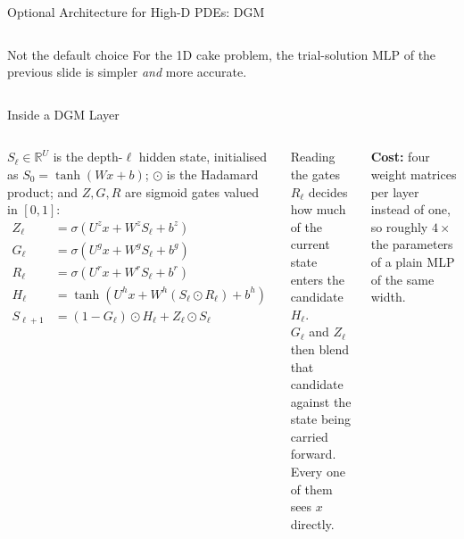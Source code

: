 \documentclass[aspectratio=169,11pt]{beamer}
\newcommand{\R}{\mathbb{R}}
\begin{document}
\begin{frame}{Optional Architecture for High-D PDEs: DGM}
\begin{columns}[T]
\vspace{0.4em}
\begin{alertblock}{Not the default choice}
\footnotesize
For the 1D cake problem, the trial-solution MLP of the previous slide is simpler \emph{and} more accurate.
\end{alertblock}
\end{columns}
\end{frame}

\begin{frame}{Inside a DGM Layer}
\begin{columns}[T]
{\small $S_\ell\in\R^U$ is the depth-$\ell$ hidden state, initialised as $S_0=\tanh(Wx+b)$; $\odot$ is the Hadamard product; and $Z,G,R$ are sigmoid gates valued in $[0,1]$:}
\vspace{0.2em}
{\small\begin{align*}
Z_\ell &= \sigma(U^z x + W^z S_\ell + b^z)\\
G_\ell &= \sigma(U^g x + W^g S_\ell + b^g)\\
R_\ell &= \sigma(U^r x + W^r S_\ell + b^r)\\
H_\ell &= \tanh(U^h x + W^h (S_\ell \odot R_\ell) + b^h)\\
S_{\ell+1} &= (1 - G_\ell)\odot H_\ell + Z_\ell \odot S_\ell
\end{align*}}

\begin{block}{Reading the gates}
\footnotesize
$R_\ell$ decides how much of the current state enters the candidate $H_\ell$.\\[4pt]
$G_\ell$ and $Z_\ell$ then blend that candidate against the state being carried forward.\\[4pt]
Every one of them sees $x$ directly.
\end{block}

\vspace{0.4em}
{\footnotesize \textbf{Cost:} four weight matrices per layer instead of one, so roughly $4\times$ the parameters of a plain MLP of the same width.}
\end{columns}
\end{frame}
\end{document}
